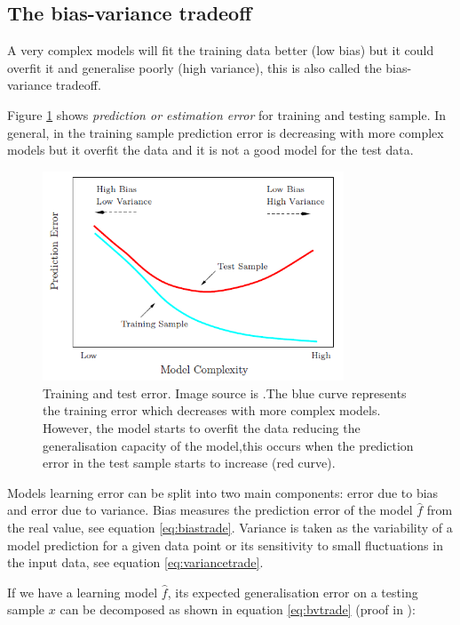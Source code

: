 \subsection{The bias-variance tradeoff} \label{sec:biasvar}

A very complex models will fit the training data better (low bias) but it could
overfit it and generalise poorly (high variance), this is also called the
bias-variance tradeoff.  

Figure \ref{fig:traintesterror} shows {\em prediction or estimation error} for
training and testing sample.  In general, in the training sample prediction
error is decreasing with more complex models but it overfit the data and it is
not a good model for the test data. 

\begin{figure}[!h]
  \centering
  \includegraphics[width=0.8\textwidth]{img/model_complexity}
  \caption{Training and test error. Image source is
\cite{friedman2001elements}.The blue curve represents the training error which
decreases with more complex models. However, the model starts to overfit the
data reducing the generalisation capacity of the model,this occurs when the
prediction error in the test sample starts to increase (red curve).}
  \label{fig:traintesterror}
\end{figure}

Models learning error can be split into two main components: error due to bias
and error due to variance. Bias measures the prediction error of the model
$\hat{f}$ from the real value, see equation \ref{eq:biastrade}. Variance is
taken as the variability of a model prediction for a given data point or its
sensitivity to small fluctuations in the input data, see equation
\ref{eq:variancetrade}.

If we have a learning model $\hat{f}$, its expected generalisation error on a
testing sample $x$ can be decomposed as shown in equation \ref{eq:bvtrade} (proof
in \cite{geman1992neural}):


